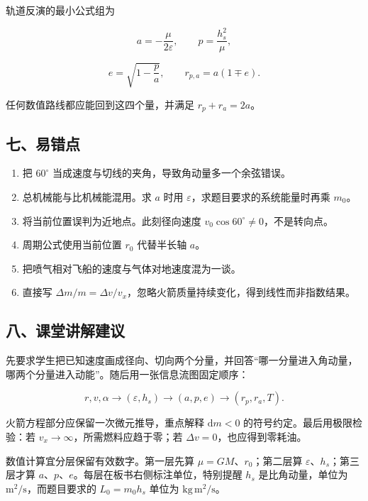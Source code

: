 \documentclass[12pt,a4paper,UTF8]{ctexart}
\newcommand{\tightlist}{\setlength{\itemsep}{0pt}\setlength{\parskip}{0pt}}
\begin{document}
轨道反演的最小公式组为

\[a=-\frac\mu{2\varepsilon},
\qquad
p=\frac{h_s^2}{\mu},\]

\[e=\sqrt{1-\frac pa},
\qquad
r_{p,a}=a(1\mp e).\]

任何数值路线都应能回到这四个量，并满足 \(r_p+r_a=2a\)。

\subsection{七、易错点}\label{ux4e03ux6613ux9519ux70b9-1}

\begin{enumerate}
\def\labelenumi{\arabic{enumi}.}
\tightlist
\item
  把 \(60^\circ\) 当成速度与切线的夹角，导致角动量多一个余弦错误。
\item
  总机械能与比机械能混用。求 \(a\) 时用
  \(\varepsilon\)，求题目要求的系统能量时再乘 \(m_0\)。
\item
  将当前位置误判为近地点。此刻径向速度
  \(v_0\cos60^\circ\ne0\)，不是转向点。
\item
  周期公式使用当前位置 \(r_0\) 代替半长轴 \(a\)。
\item
  把喷气相对飞船的速度与气体对地速度混为一谈。
\item
  直接写
  \(\Delta m/m=\Delta v/v_x\)，忽略火箭质量持续变化，得到线性而非指数结果。
\end{enumerate}

\subsection{八、课堂讲解建议}\label{ux516bux8bfeux5802ux8bb2ux89e3ux5efaux8bae-1}

先要求学生把已知速度画成径向、切向两个分量，并回答``哪一分量进入角动量，哪两个分量进入动能''。随后用一张信息流图固定顺序：

\[r,v,\alpha\longrightarrow(\varepsilon,h_s)\longrightarrow(a,p,e)
\longrightarrow(r_p,r_a,T).\]

火箭方程部分应保留一次微元推导，重点解释 \(\mathrm dm<0\)
的符号约定。最后用极限检验：若 \(v_x\to\infty\)，所需燃料应趋于零；若
\(\Delta v=0\)，也应得到零耗油。

数值计算宜分层保留有效数字。第一层先算 \(\mu=GM\)、\(r_0\)；第二层算
\(\varepsilon\)、\(h_s\)；第三层才算
\(a\)、\(p\)、\(e\)。每层在板书右侧标注单位，特别提醒 \(h_s\)
是比角动量，单位为 \(\mathrm{m^2/s}\)，而题目要求的 \(L_0=m_0h_s\)
单位为 \(\mathrm{kg\,m^2/s}\)。
\end{document}
